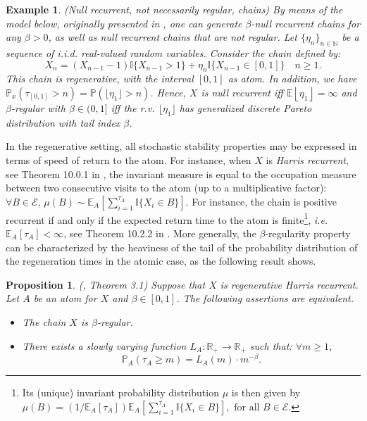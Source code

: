 \documentclass[sn-mathphys-ay]{sn-jnl}%
\newtheorem{proposition}{Proposition}[section]%
\newtheorem{example}{Example}%
\newcommand{\E}{\mathbb{E}}
\begin{document}
\begin{example}\label{ex3}{\sc (Null recurrent, not necessarily regular, chains)}
    By means of the model below, originally presented in \cite{Myklebust-2012}, one can
    generate \(\beta\)-null recurrent chains for any \(\beta>0\), as well as null
    recurrent chains that are not regular. Let \(\{\eta_n\}_{n\in \mathbb{N}}\) be a
    sequence of i.i.d. real-valued random variables. Consider the chain defined by:
    \begin{equation*}
        X_n=(X_{n-1}-1)\mathbb{I}\{X_{n-1}>1\}+\eta_n \mathbb{I}\{
        X_{n-1}\in [0,1]\}\quad n\geq 1.
    \end{equation*}
    This chain is regenerative, with the interval \(\left[ {0,1} \right]\) as atom.
    In addition, we have \(\mathbb{P}_x( {{\tau _{\left[ {0,1} \right]}} > n}) =
    \mathbb{P}( {\lfloor {\eta _1}} \rfloor > n )\). Hence, \(X\) is null recurrent iff
    \(\mathbb{E}{\left\lfloor {{\eta _1}} \right\rfloor }=\infty\) and \(\beta\)-regular
    with $\beta\in (0,1]$ iff the r.v. $\lfloor \eta _1 \rfloor$ has generalized discrete
    Pareto distribution with tail index $\beta$.
\end{example}

In the regenerative setting, all stochastic stability properties may be expressed in
terms of speed of return to the atom. For instance, when $X$ is \textit{Harris
    recurrent}, see Theorem 10.0.1 in \cite{Meyn2009}, the invariant measure is equal to the
occupation measure between two consecutive visits to the atom (up to a multiplicative
factor): $\forall B\in \mathcal{E}$, $\mu(B)\sim \E_{A}\left[ \sum
    _{i=1}^{\tau_{A}}\mathbb{I}\{X_{i}\in B\}\right]$. For instance, the chain is positive
recurrent if and only if the expected return time to the atom is finite\footnote{Its
(unique) invariant probability distribution $\mu$ is then given by
$\mu(B)=(1/\mathbb{E}_{A}[\tau_{A}])\mathbb{E}_{A}[
    \sum_{i=1}^{\tau_{A}}\mathbb{I}\{X_{i}\in B\}],\text{ for all } B\in\mathcal{E}$.},
\textit{i.e.} $\mathbb{E}_{A}[\tau_{A}]<\infty$, see Theorem 10.2.2 in \cite{Meyn2009}.
More generally, the $\beta$-regularity property can be characterized by the heaviness of
the tail of the probability distribution of the regeneration times in the atomic case, as
the following result shows.%

\begin{proposition}\label{prop:atomic} (\cite{Tjostheim-2001}, Theorem 3.1) Suppose that
    $X$ is regenerative Harris recurrent. Let $A$ be an atom for $X$ and
    $\beta\in [0,1]$. The following assertions are equivalent.
    \begin{itemize}
        \item[(i)] The chain $X$ is $\beta$-regular.
        \item[(ii)] There exists a slowly varying function $L_A:\mathbb{R}_+\rightarrow \mathbb{R}_+$ such that: $\forall m\geq 1$,
              \begin{equation}
                  \mathbb{P}_A\left( \tau_A \geq m \right)=L_A(m)\cdot m^{-\beta}.
              \end{equation}
    \end{itemize}
\end{proposition}
\end{document}
